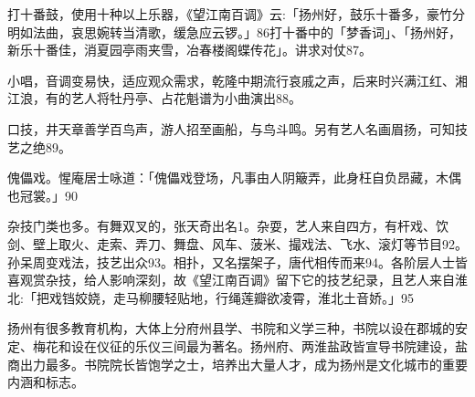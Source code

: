 打十番鼓，使用十种以上乐器，《望江南百调》云:「扬州好，鼓乐十番多，豪竹分明如法曲，哀思婉转当清歌，缓急应云锣。」86打十番中的「梦香词」、「扬州好，新乐十番佳，消夏园亭雨夹雪，冶春楼阁蝶传花」。讲求对仗87。

小唱，音调变易快，适应观众需求，乾隆中期流行哀戚之声，后来时兴满江红、湘江浪，有的艺人将牡丹亭、占花魁谱为小曲演出88。

口技，井天章善学百鸟声，游人招至画船，与鸟斗鸣。另有艺人名画眉扬，可知技艺之绝89。

傀儡戏。惺庵居士咏道：「傀儡戏登场，凡事由人阴簸弄，此身枉自负昂藏，木偶也冠裳。」90

杂技门类也多。有舞双叉的，张天奇出名1。杂耍，艺人来自四方，有杆戏、饮剑、壁上取火、走索、弄刀、舞盘、风车、菠米、撮戏法、飞水、滚灯等节目92。孙呆周变戏法，技艺出众93。相扑，又名摆架子，唐代相传而来94。各阶层人士皆喜观赏杂技，给人影响深刻，故《望江南百调》留下它的技艺纪录，且艺人来自淮北:「把戏铛姣娆，走马柳腰轻贴地，行绳莲瓣欲凌霄，淮北土音娇。」95

\vfill
\begin{BookNotes}
\end{BookNotes}


扬州有很多教育机构，大体上分府州县学、书院和义学三种，书院以设在郡城的安定、梅花和设在仪征的乐仪三间最为著名。扬州府、两淮盐政皆宣导书院建设，盐商出力最多。书院院长皆饱学之士，培养出大量人才，成为扬州是文化城市的重要内涵和标志。

